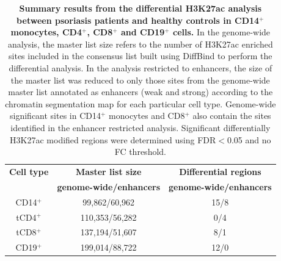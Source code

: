 \begin{table}[htbp]
\centering
\begin{tabular}{@{} c c c}
\toprule
\textbf{Cell type}   & \textbf{Master list size}      & \textbf{Differential regions}      \\
                     & \textbf{genome-wide/enhancers} & \textbf{genome-wide/enhancers}     \\
\midrule
\midrule
CD14$^+$             & 99,862/60,962                  & 15/8                                \\
tCD4$^+$              & 110,353/56,282                 & 0/4																	\\
tCD8$^+$              & 137,194/51,607                 & 8/1                                 \\ 
CD19$^+$             & 199,014/88,722                 & 12/0                                 \\
\bottomrule 
\end{tabular}
\medskip %
\caption[Summary results from the differential H3K27ac analysis between psoriasis patients and healthy controls in CD14$^+$ monocytes, CD4$^+$, CD8$^+$ and CD19$^+$ cells.]{\textbf{Summary results from the differential H3K27ac analysis between psoriasis patients and healthy controls in CD14$^+$ monocytes, CD4$^+$, CD8$^+$ and CD19$^+$ cells.} In the genome-wide analysis, the master list size refers to the number of H3K27ac enriched sites included in the consensus list built using DiffBind to perform the differential analysis. In the analysis restricted to enhancers, the size of the master list was reduced to only those sites from the genome-wide master list annotated as enhancers (weak and strong) according to the chromatin segmentation map for each particular cell type. Genome-wide significant sites in CD14$^+$ monocytes and CD8$^+$ also contain the sites identified in the enhancer restricted analysis. Significant differentially H3K27ac modified regions were determined using FDR$<$0.05 and no FC threshold.}
\label{tab:ChIPm_differential_analysis_results}
\end{table}
\bigskip %


